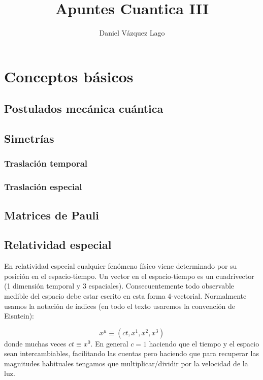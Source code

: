 \documentclass[12pt,a4paper]{article}
\title{Apuntes Cuantica III}
\author{Daniel Vázquez Lago}
\numberwithin{equation}{section}
\numberwithin{figure}{section}
\begin{document}
\maketitle

\newpage

\tableofcontents

\newpage

\section{Conceptos básicos}

\subsection{Postulados mecánica cuántica}

\subsection{Simetrías}

\subsubsection{Traslación temporal}

\subsubsection{Traslación especial}

\subsection{Matrices de Pauli}

\subsection{Relatividad especial} \label{}

En relatividad especial cualquier fenómeno físico viene determinado por su posición en el espacio-tiempo. Un vector en el espacio-tiempo es un cuadrivector (1 dimensión temporal y 3 espaciales). Consecuentemente todo observable medible del espacio debe estar escrito en esta forma 4-vectorial. Normalmente usamos la notación de índices (en todo el texto usaremos la convención de Eisntein):

\begin{equation}
    x^{\mu} \equiv (ct,x^1,x^2,x^3) 
\end{equation}
donde muchas veces $ct \equiv x^0$. En general $c=1$ haciendo que el tiempo y el espacio sean intercambiables, facilitando las cuentas pero haciendo que para recuperar las magnitudes habituales tengamos que multiplicar/dividir por la velocidad de la luz. \\
\end{document}
